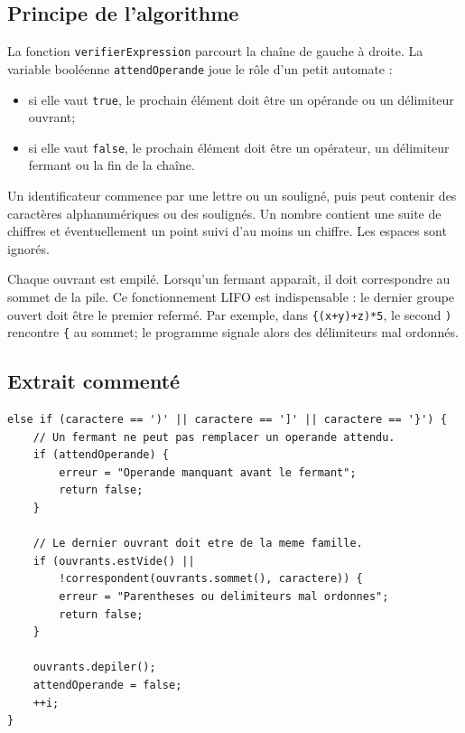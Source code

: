 \documentclass[11pt,a4paper]{article}
\begin{document}
\subsection{Principe de l'algorithme}

La fonction \texttt{verifierExpression} parcourt la chaîne de gauche à droite. La variable booléenne \texttt{attendOperande} joue le rôle d'un petit automate :

\begin{itemize}
  \item si elle vaut \texttt{true}, le prochain élément doit être un opérande ou un délimiteur ouvrant;
  \item si elle vaut \texttt{false}, le prochain élément doit être un opérateur, un délimiteur fermant ou la fin de la chaîne.
\end{itemize}

Un identificateur commence par une lettre ou un souligné, puis peut contenir des caractères alphanumériques ou des soulignés. Un nombre contient une suite de chiffres et éventuellement un point suivi d'au moins un chiffre. Les espaces sont ignorés.

Chaque ouvrant est empilé. Lorsqu'un fermant apparaît, il doit correspondre au sommet de la pile. Ce fonctionnement LIFO est indispensable : le dernier groupe ouvert doit être le premier refermé. Par exemple, dans \texttt{\{(x+y)+z)*5}, le second \texttt{)} rencontre \texttt{\{} au sommet; le programme signale alors des délimiteurs mal ordonnés.

\subsection{Extrait commenté}

\begin{lstlisting}[style=cppstyle,caption={Contrôle des délimiteurs fermants}]
else if (caractere == ')' || caractere == ']' || caractere == '}') {
    // Un fermant ne peut pas remplacer un operande attendu.
    if (attendOperande) {
        erreur = "Operande manquant avant le fermant";
        return false;
    }

    // Le dernier ouvrant doit etre de la meme famille.
    if (ouvrants.estVide() ||
        !correspondent(ouvrants.sommet(), caractere)) {
        erreur = "Parentheses ou delimiteurs mal ordonnes";
        return false;
    }

    ouvrants.depiler();
    attendOperande = false;
    ++i;
}
\end{lstlisting}
\end{document}
